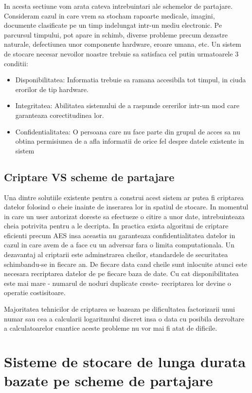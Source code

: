 \documentclass{llncs}
\begin{document}
In acesta sectiune vom arata cateva intrebuintari ale schemelor de partajare. Consideram cazul in care vrem sa stocham rapoarte medicale, imagini, documente clasificate pe un timp indelungat intr-un mediu electronic. Pe parcursul timpului, pot apare in schimb, diverse probleme precum dezastre naturale, defectiunea unor componente hardware, eroare umana, etc. \cite{SGMV:2009}
Un sistem de stocare necesar nevoilor noastre trebuie sa satisfaca cel putin urmatoarele 3 conditii:
\begin{itemize}
	\item Disponibilitatea: Informatia trebuie sa ramana accesibila tot timpul, in ciuda erorilor de tip hardware.
	\item Integritatea: Abilitatea sistemului de a raspunde cererilor intr-un mod care garanteaza corectitudinea lor.
	\item Confidentialitatea: O persoana care nu face parte din grupul de acces sa nu obtina permisiunea de a afla informatii de orice fel despre datele existente in sistem
\end{itemize}

\subsection{Criptare VS scheme de partajare}


Una dintre solutiile existente pentru a construi acest sistem ar putea fi criptarea datelor folosind o cheie inainte de inserarea lor in spatiul de stocare. In momentul in care un user autorizat doreste sa efectueze o citire a unor date, intrebuinteaza cheia potrivita pentru a le decripta.
In practica exista algoritmi de criptare eficienti precum AES insa aceastia nu garanteaza confidentialitatea datelor in cazul in care avem de a face cu un adversar fara o limita computationala. Un dezavantaj al criptarii este adminstrarea cheilor, standardele de securitatea schimbandu-se in fiecare an.
De fiecare data cand cheile sunt inlocuite atunci este necesara recriptarea datelor de pe fiecare baza de date. Cu cat disponibilitatea este mai mare - numarul de noduri duplicate creste- recriptarea lor devine o operatie costisitoare. 

Majoritatea tehnicilor de criptarea se bazeaza pe dificultatea factorizarii unui numar sau cea a calcularii logaritmului discret insa o data cu posibila dezvoltare a calculatoarelor cuantice aceste probleme nu vor mai fi atat de dificile. \cite{Shor:1994}

\section{Sisteme de stocare de lunga durata bazate pe scheme de partajare}
\end{document}
